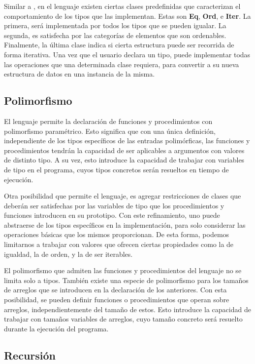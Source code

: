 Similar a \Haskell{}, en el lenguaje existen ciertas clases predefinidas que caracterizan el comportamiento de los tipos que las implementan.
Estas son \textbf{Eq}, \textbf{Ord}, e \textbf{Iter}.
La primera, será implementada por todos los tipos que se pueden igualar.
La segunda, es satisfecha por las categorías de elementos que son ordenables.
Finalmente, la última clase indica si cierta estructura puede ser recorrida de forma iterativa.
Una vez que el usuario declara un tipo, puede implementar todas las operaciones que una determinada clase requiera, para convertir a su nueva estructura de datos en una instancia de la misma.

\subsection{Polimorfismo}

El lenguaje permite la declaración de funciones y procedimientos con polimorfismo paramétrico.
Esto significa que con una única definición, independiente de los tipos específicos de las entradas polimórficas, las funciones y procedimientos tendrán la capacidad de ser aplicables a argumentos con valores de distinto tipo.
A su vez, esto introduce la capacidad de trabajar con variables de tipo en el programa, cuyos tipos concretos serán resueltos en tiempo de ejecución.

Otra posibilidad que permite el lenguaje, es agregar restricciones de clases que deberán ser satisfechas por las variables de tipo que los procedimientos y funciones introducen en su prototipo.
Con este refinamiento, uno puede abstraerse de los tipos específicos en la implementación, para solo considerar las operaciones básicas que los mismos proporcionan.
De esta forma, podemos limitarnos a trabajar con valores que ofrecen ciertas propiedades como la de igualdad, la de orden, y la de ser iterables.

El polimorfismo que admiten las funciones y procedimientos del lenguaje no se limita solo a tipos.
También existe una especie de polimorfismo para los tamaños de arreglos que se introducen en la declaración de los anteriores.
Con esta posibilidad, se pueden definir funciones o procedimientos que operan sobre arreglos, independientemente del tamaño de estos.
Esto introduce la capacidad de trabajar con tamaños variables de arreglos, cuyo tamaño concreto será resuelto durante la ejecución del programa.

\subsection{Recursión}


